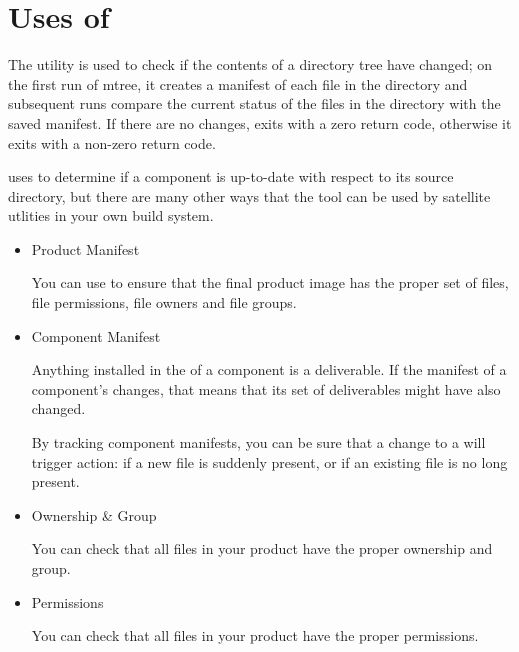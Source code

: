%
%
%
%
\chapter{Uses of \mtree}\label{chap:mtree}

The \mtree utility is used to check if the contents of a directory
tree have changed; on the first run of mtree, it creates a manifest of
each file in the directory and subsequent runs compare the current
status of the files in the directory with the saved manifest.  If
there are no changes, \mtree exits with a zero return code, otherwise
it exits with a non-zero return code.

\lmsbw uses \mtree to determine if a component is up-to-date with
respect to its source directory, but there are many other ways that
the tool can be used by satellite utlities in your own build system.

\begin{itemize}
\item Product Manifest

  You can use \mtree to ensure that the final product image has the
  proper set of files, file permissions, file owners and file groups.

\item Component Manifest

  Anything installed in the \destdir of a component is a deliverable.
  If the manifest of a component's \destdir changes, that means that
  its set of deliverables might have also changed.

  By tracking component \destdir manifests, you can be sure that a
  change to a \destdir will trigger action: if a new file is
  suddenly present, or if an existing file is no long present.

\item Ownership \& Group

  You can check that all files in your product have the proper
  ownership and group.

\item Permissions

  You can check that all files in your product have the proper
  permissions.

\end{itemize}
